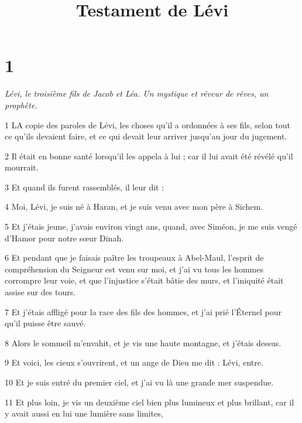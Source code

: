 

\title{Testament de Lévi}

\chapter{1}

\par \textit{Lévi, le troisième fils de Jacob et Léa. Un mystique et rêveur de rêves, un prophète.}

\par 1 LA copie des paroles de Lévi, les choses qu'il a ordonnées à ses fils, selon tout ce qu'ils devaient faire, et ce qui devait leur arriver jusqu'au jour du jugement.

\par 2 Il était en bonne santé lorsqu'il les appela à lui ; car il lui avait été révélé qu'il mourrait.

\par 3 Et quand ils furent rassemblés, il leur dit :

\par 4 Moi, Lévi, je suis né à Haran, et je suis venu avec mon père à Sichem.

\par 5 Et j'étais jeune, j'avais environ vingt ans, quand, avec Siméon, je me suis vengé d'Hamor pour notre sœur Dinah.

\par 6 Et pendant que je faisais paître les troupeaux à Abel-Maul, l'esprit de compréhension du Seigneur est venu sur moi, et j'ai vu tous les hommes corrompre leur voie, et que l'injustice s'était bâtie des murs, et l'iniquité était assise sur des tours.

\par 7 Et j'étais affligé pour la race des fils des hommes, et j'ai prié l'Éternel pour qu'il puisse être sauvé.

\par 8 Alors le sommeil m'envahit, et je vis une haute montagne, et j'étais dessus.

\par 9 Et voici, les cieux s'ouvrirent, et un ange de Dieu me dit : Lévi, entre.

\par 10 Et je suis entré du premier ciel, et j'ai vu là une grande mer suspendue.

\par 11 Et plus loin, je vis un deuxième ciel bien plus lumineux et plus brillant, car il y avait aussi en lui une lumière sans limites,

